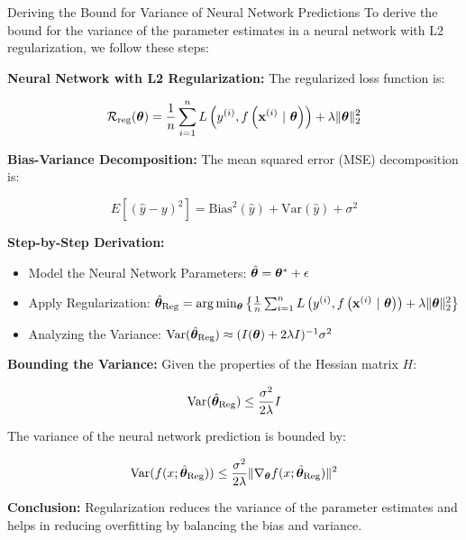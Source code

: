 \documentclass[11pt,compress,t,notes=noshow, xcolor=table]{beamer}
\begin{document}
\begin{vbframe}{Deriving the Bound for Variance of Neural Network Predictions}
To derive the bound for the variance of the parameter estimates in a neural network with L2 regularization, we follow these steps:

\textbf{Neural Network with L2 Regularization:}
The regularized loss function is:

\[
\mathcal{R}_{\text{reg}}(\bm{\theta}) = \frac{1}{n} \sum_{i=1}^{n} L\left(y^{(i)}, f\left(\mathbf{x}^{(i)} ~|~ \bm{\theta}\right)\right) + \lambda \|\bm{\theta}\|_2^2
\]

\textbf{Bias-Variance Decomposition:}
The mean squared error (MSE) decomposition is:

\[
E[(\hat{y} - y)^2] = \text{Bias}^2(\hat{y}) + \text{Var}(\hat{y}) + \sigma^2
\]

\textbf{Step-by-Step Derivation:}
\begin{itemize}
    \item Model the Neural Network Parameters: \( \hat{\bm{\theta}} = \bm{\theta}^* + \epsilon \)
    \item Apply Regularization: \( \hat{\bm{\theta}}_{\text{Reg}} = \arg \min_{\bm{\theta}} \left\{ \frac{1}{n} \sum_{i=1}^{n} L\left(y^{(i)}, f\left(\mathbf{x}^{(i)} ~|~ \bm{\theta}\right)\right) + \lambda \|\bm{\theta}\|_2^2 \right\} \)
    \item Analyzing the Variance: \( \text{Var}(\hat{\bm{\theta}}_{\text{Reg}}) \approx (I(\bm{\theta}) + 2\lambda I)^{-1} \sigma^2 \)
\end{itemize}

\textbf{Bounding the Variance:}
Given the properties of the Hessian matrix \(H\):

\[
\text{Var}(\hat{\bm{\theta}}_{\text{Reg}}) \leq \frac{\sigma^2}{2\lambda} I
\]

The variance of the neural network prediction is bounded by:

\[
\text{Var}(f(x; \hat{\bm{\theta}}_{\text{Reg}})) \leq \frac{\sigma^2}{2\lambda} \|\nabla_{\bm{\theta}} f(x; \hat{\bm{\theta}}_{\text{Reg}})\|^2
\]

\textbf{Conclusion:}
Regularization reduces the variance of the parameter estimates and helps in reducing overfitting by balancing the bias and variance.
\end{vbframe}
\end{document}
